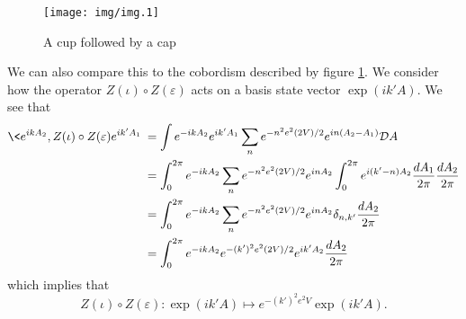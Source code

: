 \begin{figure}[ht]
\texttt{[image: img/img.1]}
\caption{A cup followed by a cap}\label{fig:img1}
\end{figure}

We can also compare this to the cobordism described by figure
\ref{fig:img1}. We consider how the operator
$Z(\iota)\circ{}Z(\varepsilon)$ acts on a basis state vector
$\exp(ik'A)$. We see that
\begin{subequations}
\begin{align}
\<e^{ikA_{2}},Z(\iota)\circ{}Z(\varepsilon)e^{ik'A_{1}}\> &= \int e^{-ikA_{2}}e^{ik'A_{1}}\sum_{n}e^{-n^{2}e^{2}(2V)/2}e^{in(A_{2}-A_{1})}\mathcal{D}A\\
&= \int^{2\pi}_{0} e^{-ikA_{2}}\sum_{n}e^{-n^{2}e^{2}(2V)/2}e^{inA_{2}}\int^{2\pi}_{0}e^{i(k'-n)A_{2}}\frac{dA_{1}}{2\pi}\frac{dA_{2}}{2\pi}\\
&= \int^{2\pi}_{0} e^{-ikA_{2}}\sum_{n}e^{-n^{2}e^{2}(2V)/2}e^{inA_{2}}\delta_{n,k'}\frac{dA_{2}}{2\pi}\\
&= \int^{2\pi}_{0} e^{-ikA_{2}}e^{-(k')^{2}e^{2}(2V)/2}e^{ik'A_{2}}\frac{dA_{2}}{2\pi}
\end{align}
\end{subequations}
which implies that
\begin{equation}%
Z(\iota)\circ{}Z(\varepsilon):\exp(ik'A)\mapsto e^{-(k')^{2}e^{2}V}\exp(ik'A).
\end{equation}
